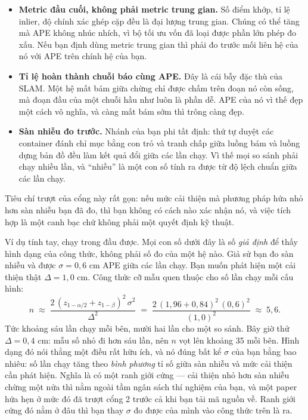 \documentclass[../../deep_learning.tex]{subfiles}
\begin{document}
\begin{itemize}
\item \textbf{Metric đầu cuối, không phải metric trung gian.} Số điểm khớp, tỉ lệ inlier, độ chính xác ghép cặp đều là đại lượng trung gian. Chúng có thể tăng mà APE không nhúc nhích, vì bộ tối ưu vốn đã loại được phần lớn phép đo xấu. Nếu bạn định dùng metric trung gian thì phải đo trước mối liên hệ của nó với APE trên chính hệ của bạn.
\item \textbf{Tỉ lệ hoàn thành chuỗi báo cùng APE.} Đây là cái bẫy đặc thù của SLAM. Một hệ mất bám giữa chừng chỉ được chấm trên đoạn nó còn sống, mà đoạn đầu của một chuỗi hầu như luôn là phần dễ. APE của nó vì thế đẹp một cách vô nghĩa, và càng mất bám sớm thì trông càng đẹp.
\item \textbf{Sàn nhiễu đo trước.} Nhánh của bạn phi tất định: thứ tự duyệt các container đánh chỉ mục bằng con trỏ và tranh chấp giữa luồng bám và luồng dựng bản đồ đều làm kết quả đổi giữa các lần chạy. Vì thế mọi so sánh phải chạy nhiều lần, và ``nhiều'' là một con số tính ra được từ độ lệch chuẩn giữa các lần chạy.
\end{itemize}

Tiêu chí trượt của cổng này rất gọn: nếu mức cải thiện mà phương pháp hứa nhỏ hơn sàn nhiễu bạn đã đo, thì bạn không có cách nào xác nhận nó, và việc tích hợp là một canh bạc chứ không phải một quyết định kỹ thuật.

Ví dụ tính tay, chạy trong đầu được. Mọi con số dưới đây là số \emph{giả định} để thấy hình dạng của công thức, không phải số đo của một hệ nào. Giả sử bạn đo sàn nhiễu và được \(\sigma = 0{,}6\) cm APE giữa các lần chạy. Bạn muốn phát hiện một cải thiện thật \(\Delta = 1{,}0\) cm. Công thức cỡ mẫu quen thuộc cho số lần chạy mỗi cấu hình:
\[
n \;\approx\; \frac{2\,(z_{1-\alpha/2}+z_{1-\beta})^2\,\sigma^2}{\Delta^2}
\;=\; \frac{2\,(1{,}96+0{,}84)^2\,(0{,}6)^2}{(1{,}0)^2} \;\approx\; 5{,}6 .
\]
Tức khoảng sáu lần chạy mỗi bên, mười hai lần cho một so sánh. Bây giờ thử \(\Delta = 0{,}4\) cm: mẫu số nhỏ đi hơn sáu lần, nên \(n\) vọt lên khoảng 35 mỗi bên. Hình dạng đó nói thẳng một điều rất hữu ích, và nó đúng bất kể \(\sigma\) của bạn bằng bao nhiêu: số lần chạy tăng theo \emph{bình phương} tỉ số giữa sàn nhiễu và mức cải thiện cần phát hiện. Nghĩa là có một ranh giới cứng --- cải thiện nhỏ hơn sàn nhiễu chừng một nửa thì nằm ngoài tầm ngân sách thí nghiệm của bạn, và một paper hứa hẹn ở mức đó đã trượt cổng 2 trước cả khi bạn tải mã nguồn về. Ranh giới cứng đó nằm ở đâu thì bạn thay \(\sigma\) đo được của mình vào công thức trên là ra.
\end{document}
